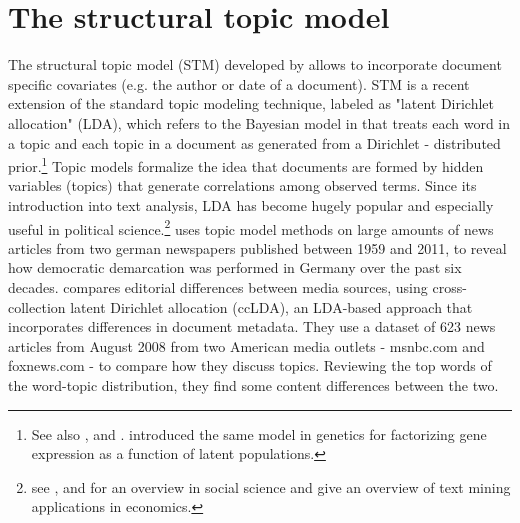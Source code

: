 \documentclass[12pt,a4paper,notitlepage]{article}
\begin{document}
\section{The structural topic model}\label{ch_model}

The structural topic model (STM) developed by \citet{roberts_model_2016} allows to incorporate document specific covariates (e.g. the author or date of a document). STM is a recent extension of the standard topic modeling technique, labeled as "latent Dirichlet allocation" (LDA), which refers to the Bayesian model in \citet{blei_latent_2003} that treats each word in a topic and each topic in a document as generated from a Dirichlet - distributed prior.\footnote{See also \citet{griffiths_probabilistic_2002}, \citet{griffiths_finding_2004} and \citet{hofmann_probabilistic_1999}. \citet{pritchard_inference_2000} introduced the same model in genetics for factorizing gene expression as a function of latent populations.} Topic models formalize the idea that documents are formed by hidden variables (topics) that generate correlations among observed terms. Since its introduction into text analysis, LDA has become hugely popular and especially useful in political science.\footnote{see \citet{blei_probabilistic_2012}, \citet{grimmer_text_2013} and \citet{wiedmann_text_2016} for an overview in social science and \citet{gentzkow_text_2017} give an overview of text mining applications in economics.} \citet{wiedmann_text_2016} uses topic model methods on large amounts of news articles from two german newspapers published between 1959 and 2011, to reveal how democratic demarcation was performed in Germany over the past six decades. \citet{paul_cross-collection_2017} compares editorial differences between media sources, using cross-collection latent Dirichlet allocation (ccLDA), an LDA-based approach that incorporates differences in document metadata. They use a dataset of 623 news articles from August 2008 from two American media outlets - msnbc.com and foxnews.com - to compare how they discuss topics. Reviewing the top words of the word-topic distribution, they find some content differences between the two. 
\end{document}
